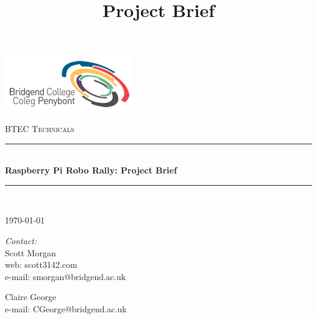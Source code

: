 \documentclass[10pt]{article}
\title{Project Brief}
\begin{document}
	\begin{center}																		%
		\newcommand{\HRule}{\rule{\linewidth}{0.5mm}}									%
			\begin{flushright}
				\includegraphics[scale = 1]{bcoll.png}
		\end{flushright}
		
		\vspace*{3cm}								%
		\textsc{\huge BTEC Technicals}\\[1.5cm]
		
		\vspace{3cm}											%
		\HRule \\[0.4cm]																	%
		{ \huge \bfseries Raspberry Pi Robo Rally: Project Brief}\\[0.4cm]	%
		\HRule \\[1.5cm]																	%
		
		\vspace{2cm} 																				
		\begin{center}																					
			{\large \today}																	%
		\end{center}												  						
	\end{center}	
	\vspace*{3cm}																			
	
	\begin{minipage}{0.52\textwidth}													%
		\begin{flushleft} \large															%
			\emph{Contact: %
			}\\	
			Scott Morgan\\
			web: scott3142.com\\
			e-mail: smorgan@bridgend.ac.uk\\
		\end{flushleft}																		%
	\end{minipage}
	\begin{minipage}{0.46\textwidth}	
		\begin{flushright} \large															%
			Claire George\\
			e-mail: CGeorge@bridgend.ac.uk\\
		\end{flushright}																		%
	\end{minipage}
	
\end{document}
